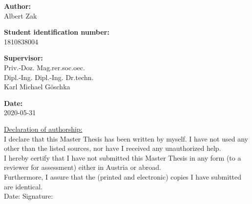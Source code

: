 \begin{center}
  \vspace{2cm}

  \hspace*{-1.0cm} \textbf{Author:} \\
  \vspace{0.2cm}
  \hspace*{-1.0cm} Albert Zak \\
  \vspace{0.7cm}

  \hspace*{-1.0cm} \textbf{Student identification number:}  \\
  \vspace{0.2cm}
  \hspace*{-1.0cm} 1810838004 \\
  \vspace{0.7cm}

  \hspace*{-1.0cm} \textbf{Supervisor:} \\
  \vspace{0.2cm}
  \hspace*{-1.0cm} Priv.-Doz. Mag.rer.soc.oec.\\
  \hspace*{-1.0cm} Dipl.-Ing. Dipl.-Ing. Dr.techn.\\
  \hspace*{-1.0cm} Karl Michael Göschka \\
  \vspace{0.7cm}

  \hspace*{-1.0cm} \textbf{Date:} \\
  \vspace{0.2cm}
  \hspace*{-1.0cm} 2020-05-31 \\

\end{center}

\newpage

\vspace*{16cm}
\begin{flushleft}
  \underline{Declaration of authorship:}\\
  \vspace{0.5cm}
  I declare that this Master Thesis has been written by myself. I have not used any other than the listed sources, nor have I received any unauthorized help.\\
  \vspace{0.5cm}
  I hereby certify that I have not submitted this Master Thesis in any form (to a reviewer for assessment) either in Austria or abroad.\\
  \vspace{0.5cm}
  Furthermore, I assure that the (printed and electronic) copies I have submitted are identical.\\
  \vspace{1cm}
  Date: \hspace{5.3cm} Signature:
\end{flushleft}
